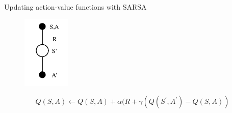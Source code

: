 \bgroup
\begin{frame}{Updating action-value functions with SARSA}
\begin{figure}
\centering
\includegraphics[width=0.2\textwidth]{img/sarsa.pdf}
\end{figure}
\begin{equation*}
Q(S,A) \leftarrow Q(S,A) + \alpha (R + \gamma (
Q(S^{\prime}, A^{\prime}) - Q(S,A))
\end{equation*}
\end{frame}
\egroup